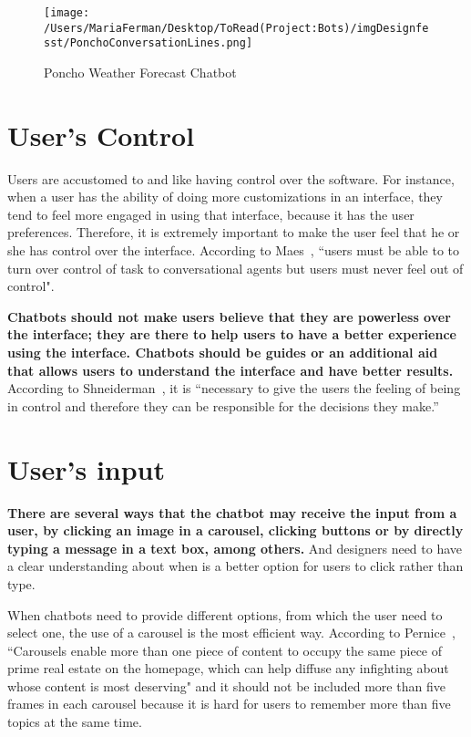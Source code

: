 \documentclass[a4paper,10pt]{article}
\begin{document}
\begin{figure}
\centering
\texttt{[image: /Users/MariaFerman/Desktop/ToRead(Project:Bots)/imgDesignfesst/PonchoConversationLines.png]}
\caption{Poncho Weather Forecast Chatbot}
\label{FigurePoncho}
\end{figure}
\section{User's Control}

Users are accustomed to and like having control over the software. For instance, when a user has the ability of doing more customizations in an interface, they tend to feel more engaged in using that interface, because it has the user preferences. Therefore, it is extremely important to make the user feel that he or she has control over the interface. According to Maes~\cite{shneiderman1997direct}, ``users must be able to to turn over control of task to conversational agents but users must never feel out of control".

\textbf{Chatbots should not make users believe that they are powerless over the interface; they are there to help users to have a better experience using the interface. Chatbots should be guides or an additional aid that allows users to understand the interface and have better results.} According to Shneiderman~\cite{shneiderman1997direct}, it is ``necessary to give the users the feeling of being in control and therefore they can be responsible for the decisions they make.” 
\section{User's input}

\textbf{There are several ways that the chatbot may receive the input from a user, by clicking an image in a carousel, clicking buttons or by directly typing a message in a text box, among others.} And designers need to have a clear understanding about when is a better option for users to click rather than type. 

When chatbots need to provide different options, from which the user need to select one, the use of a carousel is the most efficient way. According to Pernice~\cite{carousel}, ``Carousels enable more than one piece of content to occupy the same piece of prime real estate on the homepage, which can help diffuse any infighting about whose content is most deserving" and it should not be included more than five frames in each carousel because it is hard for users to remember more than five topics at the same time.
\end{document}

